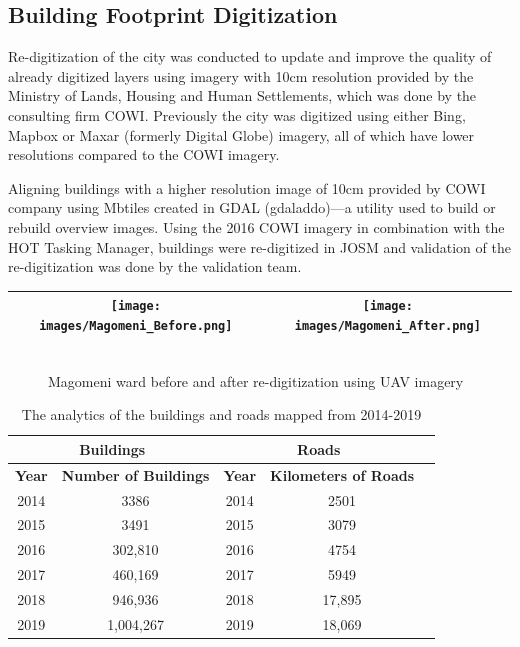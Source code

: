 \documentclass[a4paper,12pt,twoside]{article}
\begin{document}
\subsection{Building Footprint Digitization}
\begin{multicols}{2}
Re-digitization of the city was conducted to update and improve the quality of already digitized layers using imagery with 10cm resolution provided by the Ministry of Lands, Housing and Human Settlements, which was done by the consulting firm COWI. Previously the city was digitized using either Bing, Mapbox or Maxar (formerly Digital Globe) imagery, all of which have lower resolutions compared to the COWI imagery.

Aligning buildings with a higher resolution image of 10cm provided by COWI company using Mbtiles created in GDAL (gdaladdo)---a utility used to build or rebuild overview images. Using the 2016 COWI imagery in combination with the HOT Tasking Manager, buildings were re-digitized in JOSM and validation of the re-digitization was done by the validation team.
\end{multicols}


\begin{tabular}{|c@{}c|}
	\hline
	
	\texttt{[image: images/Magomeni\_Before.png]}&%
	\texttt{[image: images/Magomeni\_After.png]}\\
	\hline
\end{tabular}
 \begin{figure}[h]
	\caption{Magomeni ward before and after re-digitization using UAV imagery}
	\centering
	\includegraphics[width=0\textwidth]{images/Building_Footprint_Digitization.png}
\end{figure}

\begin{table}[h!]
\begin{center}
\begin{tabular}{|c|c|c|c|c|}
\hline
\multicolumn{2}{|c|}{\bfseries Buildings} & \multicolumn{2}{|c|}{\bfseries Roads}\\
\hline
\bfseries Year & \bfseries Number of Buildings & \bfseries Year & \bfseries Kilometers of Roads\\
\hline
2014 & 3386 & 2014 & 2501\\
\hline
2015 & 3491 & 2015 & 3079\\
\hline
2016 & 302,810 & 2016 & 4754\\
\hline
2017 & 460,169 & 2017 & 5949\\
\hline
2018 & 946,936 & 2018 & 17,895\\
\hline
2019 & 1,004,267 & 2019 & 18,069\\
\hline
\end{tabular}
\caption{\label{tab:table-name}The analytics of the buildings and roads mapped from 2014-2019}
\end{center}
\end{table}
\end{document}

